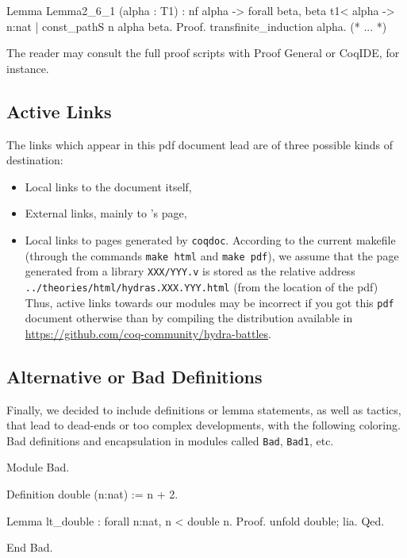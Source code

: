 \documentclass[a4paper]{book}
\begin{document}
\begin{Coqsrc}
Lemma Lemma2_6_1 (alpha : T1) :  
  nf alpha -> forall beta,  beta t1< alpha  ->
  {n:nat | const_pathS n alpha beta}.
Proof.
  transfinite_induction alpha.
  (* ... *)
\end{Coqsrc}

The reader may consult the full proof scripts with Proof General or CoqIDE, for instance.


\subsection{Active Links}
The  links which appear in this pdf  document lead are of three possible kinds of destination:
\begin{itemize}
\item Local links to the document itself,
\item External links, mainly to \coq's page,
\item Local links to pages generated by \texttt{coqdoc}. According to the current makefile (through the commands \texttt{make html} and \texttt{make pdf}), 
  we assume that the page generated from a library \texttt{XXX/YYY.v} is stored as
the relative address \texttt{../theories/html/hydras.XXX.YYY.html} (from the location of the pdf)
Thus,  active links towards our \coq{} modules may be incorrect if you got this \texttt{pdf} document otherwise than by compiling the distribution available in
\url{https://github.com/coq-community/hydra-battles}.

\end{itemize}

\subsection{Alternative or Bad Definitions}
\label{sect:alt-proofs}
Finally, we decided to include definitions or lemma statements, as well as tactics,  that lead to
dead-ends or too complex developments, with the following coloring.
Bad definitions 
 and encapsulation in modules called \texttt{Bad}, \texttt{Bad1}, etc.


\begin{Coqbad}
Module Bad.

Definition double (n:nat)  := n + 2.
 
Lemma lt_double : forall n:nat, n < double  n.
Proof.
   unfold double; lia.
Qed.

End Bad.
\end{Coqbad}
\end{document}

